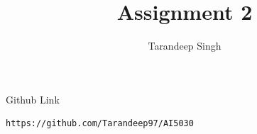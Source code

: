 \documentclass[journal,12pt,twocolumn]{IEEEtran}
\DeclareMathOperator*{\Res}{Res}
\begin{document}
\newtheorem{theorem}{Theorem}[section]
\newtheorem{problem}{Problem}
\newtheorem{proposition}{Proposition}[section]
\newtheorem{lemma}{Lemma}[section]
\newtheorem{corollary}[theorem]{Corollary}
\newtheorem{example}{Example}[section]
\newtheorem{definition}[problem]{Definition}

\newcommand{\BEQA}{\begin{eqnarray}}
\newcommand{\EEQA}{\end{eqnarray}}
\newcommand{\define}{\stackrel{\triangle}{=}}

\raggedbottom
\setlength{\parindent}{0pt}
\providecommand{\mbf}{\mathbf}
\providecommand{\pr}[1]{\ensuremath{\Pr\left(#1\right)}}
\providecommand{\qfunc}[1]{\ensuremath{Q\left(#1\right)}}
\providecommand{\sbrak}[1]{\ensuremath{{}\left[#1\right]}}
\providecommand{\lsbrak}[1]{\ensuremath{{}\left[#1\right.}}
\providecommand{\rsbrak}[1]{\ensuremath{{}\left.#1\right]}}
\providecommand{\brak}[1]{\ensuremath{\left(#1\right)}}
\providecommand{\lbrak}[1]{\ensuremath{\left(#1\right.}}
\providecommand{\rbrak}[1]{\ensuremath{\left.#1\right)}}
\providecommand{\cbrak}[1]{\ensuremath{\left\{#1\right\}}}
\providecommand{\lcbrak}[1]{\ensuremath{\left\{#1\right.}}
\providecommand{\rcbrak}[1]{\ensuremath{\left.#1\right\}}}
\theoremstyle{remark}
\newtheorem{rem}{Remark}
\newcommand{\sgn}{\mathop{\mathrm{sgn}}}
\providecommand{\abs}[1]{\left\vert#1\right\vert}
\providecommand{\res}[1]{\Res\displaylimits_{#1}} 
\providecommand{\norm}[1]{\left\lVert#1\right\rVert}
\providecommand{\mtx}[1]{\mathbf{#1}}
\providecommand{\mean}[1]{E\left[ #1 \right]}
\providecommand{\fourier}{\overset{\mathcal{F}}{ \rightleftharpoons}}
\providecommand{\system}{\overset{\mathcal{H}}{ \longleftrightarrow}}
\newcommand{\solution}{\noindent \textbf{Solution: }}
\newcommand{\cosec}{\,\text{cosec}\,}
\providecommand{\dec}[2]{\ensuremath{\overset{#1}{\underset{#2}{\gtrless}}}}
\newcommand{\myvec}[1]{\ensuremath{\begin{pmatrix}#1\end{pmatrix}}}
\newcommand{\mydet}[1]{\ensuremath{\begin{vmatrix}#1\end{vmatrix}}}
\makeatletter
{}
\makeatother
\let\StandardTheFigure\thefigure
\let\vec\mathbf
\renewcommand{\thefigure}{\theproblem}
\def\putbox#1#2#3{\makebox[0in][l]{\makeb
ox[#1][l]{}\raisebox{\baselineskip}[0in][0in]{\raisebox{#2}[0in][0in]{#3}}}}
     \def\rightbox#1{\makebox[0in][r]{#1}}
     \def\centbox#1{\makebox[0in]{#1}}
     \def\topbox#1{\raisebox{-\baselineskip}[0in][0in]{#1}}
     \def\midbox#1{\raisebox{-0.5\baselineskip}[0in][0in]{#1}}
\vspace{3cm}
\title{Assignment 2}
\author{Tarandeep Singh}
\maketitle
\newpage
\bigskip
\renewcommand{\thefigure}{\theenumi}
\renewcommand{\thetable}{\theenumi}
Github Link
\begin{lstlisting}
https://github.com/Tarandeep97/AI5030
\end{lstlisting}
\end{document}
